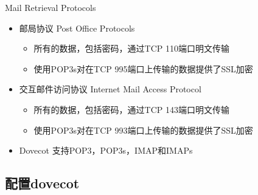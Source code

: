 \begin{frame}{Mail Retrieval Protocols}
\begin{itemize}
\item 邮局协议 Post Office Protocols

\begin{itemize}
\item 所有的数据，包括密码，通过TCP 110端口明文传输
\item 使用POP3s对在TCP 995端口上传输的数据提供了SSL加密
\end{itemize}
\item 交互邮件访问协议 Internet Mail Access Protocol

\begin{itemize}
\item 所有的数据，包括密码，通过TCP 143端口明文传输
\item 使用POP3s对在TCP 993端口上传输的数据提供了SSL加密
\end{itemize}
\item Dovecot 支持POP3，POP3s，IMAP和IMAPs
\end{itemize}

\end{frame} 
\subsection{配置dovecot}


